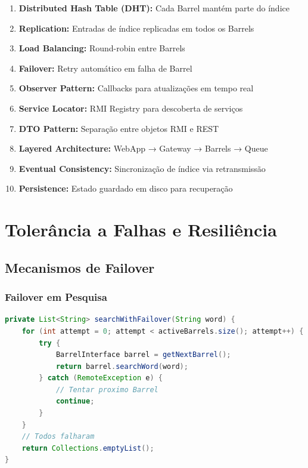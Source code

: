 \documentclass[12pt,a4paper]{article}
\begin{document}
\begin{enumerate}
    \item \textbf{Distributed Hash Table (DHT):} Cada Barrel mantém parte do índice
    \item \textbf{Replication:} Entradas de índice replicadas em todos os Barrels
    \item \textbf{Load Balancing:} Round-robin entre Barrels
    \item \textbf{Failover:} Retry automático em falha de Barrel
    \item \textbf{Observer Pattern:} Callbacks para atualizações em tempo real
    \item \textbf{Service Locator:} RMI Registry para descoberta de serviços
    \item \textbf{DTO Pattern:} Separação entre objetos RMI e REST
    \item \textbf{Layered Architecture:} WebApp → Gateway → Barrels → Queue
    \item \textbf{Eventual Consistency:} Sincronização de índice via retransmissão
    \item \textbf{Persistence:} Estado guardado em disco para recuperação
\end{enumerate}

\newpage

\section{Tolerância a Falhas e Resiliência}

\subsection{Mecanismos de Failover}

\subsubsection{Failover em Pesquisa}
\begin{lstlisting}[language=Java, caption={Retry automático}]
private List<String> searchWithFailover(String word) {
    for (int attempt = 0; attempt < activeBarrels.size(); attempt++) {
        try {
            BarrelInterface barrel = getNextBarrel();
            return barrel.searchWord(word);
        } catch (RemoteException e) {
            // Tentar proximo Barrel
            continue;
        }
    }
    // Todos falharam
    return Collections.emptyList();
}
\end{lstlisting}
\end{document}
